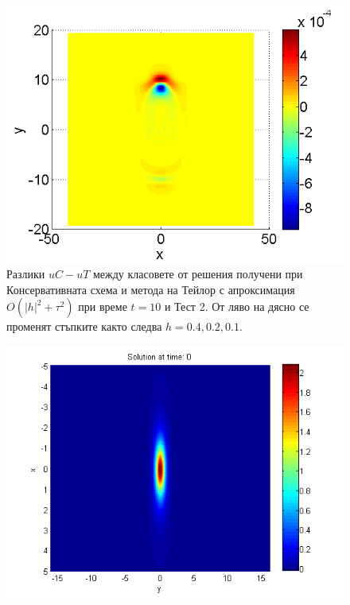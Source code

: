 \documentclass[a4paper]{article}
\theoremstyle{remark}
\begin{document}
\begin{large}
\begin{figure}[ht]
\begin{minipage}[b]{0.32\linewidth}
		\includegraphics[width=\linewidth]{SolutionDiff/TaylorZeroBndVsEnergySave_128_ZB2_bt1_c090_h010_O(h^2).png}
	\end{minipage}
\caption{Разлики $uC - uT$ между класовете от решения получени при Консервативната схема и метода на Тейлор с апроксимация $O(|h|^2 + \tau^2)$ при време $t=10$ и Тест 2. От ляво на дясно се променят стъпките както следва $h=0.4, 0.2, 0.1$.}
\label{Test2_Diff}
\end{figure}
\FloatBarrier
\begin{figure}[ht]\vspace{0.2cm}
\centering
	\begin{minipage}[b]{0.48\linewidth}
		\raggedleft
		\includegraphics[width=\linewidth]{../amitans/figures/solution_30x45_bt3_c045_T0.png}

\end{minipage}
\end{figure}
\end{large}
\end{document}

